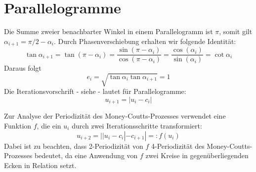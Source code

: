 \chapter{Parallelogramme}

Die Summe zweier benachbarter Winkel in einem Parallelogramm ist $\pi$,
somit gilt $\alpha_{i+1} = \pi/2 - \alpha_i$.
Durch Phasenverschiebung erhalten wir folgende Identität:
\begin{equation*}
    \tan\alpha_{i+1}  = \tan(\pi - \alpha_i)
    = \frac{\sin(\pi - \alpha_i)}{\cos(\pi - \alpha_i)}
    = \frac{\cos(\alpha_i)}{\sin(\alpha_i)}
    = \cot\alpha_i
\end{equation*}
Daraus folgt
\begin{equation*}
    e_i = \sqrt{\tan\alpha_i \tan \alpha_{i+1}} = 1
\end{equation*}
Die Iterationsvorschrift - siehe  - lautet für Parallelogramme:
\begin{equation*}
    u_{i+1}=|u_i - c_i|
\end{equation*}

Zur Analyse der Periodizität des Money-Coutts-Prozesses verwendet \citet{Troub2000}
eine Funktion $f$, die ein $u_i$ durch zwei Iterationsschritte transformiert:
\begin{equation*}
    u_{i+2}=||u_i-c_i|-c_{i+1}| =: f(u_i)
\end{equation*}
Dabei ist zu beachten, dass 2-Periodizität von $f$ 4-Periodizität des Money-Coutts-Prozesses bedeutet,
da eine Anwendung von $f$ zwei Kreise in gegenüberliegenden Ecken in Relation setzt.
